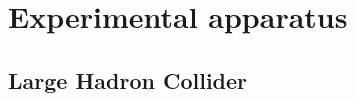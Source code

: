 \documentclass[10pt, svgnames]{beamer}
\begin{document}

\section{Experimental apparatus}
\subsection{Large Hadron Collider}
\end{document}
